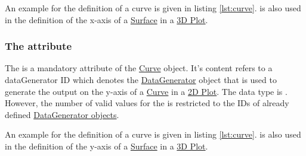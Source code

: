 An example for the definition of a curve is given in listing \ref{lst:curve}.
 is also used in the definition of the x-axis of a \hyperref[class:surface]{Surface} in a \hyperref[class:plot3D]{3D Plot}.

\subsubsection{The  attribute}
\label{sec:yDataReference}
The  is a mandatory attribute of the \hyperref[class:curve]{Curve} object. It's content refers to a dataGenerator ID which denotes the \hyperref[class:dataGenerator]{DataGenerator} object that is used to generate the output on the y-axis of a \hyperref[class:curve]{Curve} in a \hyperref[class:plot2D]{2D Plot}.
The  data type is . However, the number of valid values for the  is restricted to the IDs of already defined \hyperref[class:dataGenerator]{DataGenerator objects}.

An example for the definition of a curve is given in listing \ref{lst:curve}.
 is also used in the definition of the y-axis of a \hyperref[class:surface]{Surface} in a \hyperref[class:plot3D]{3D Plot}.

